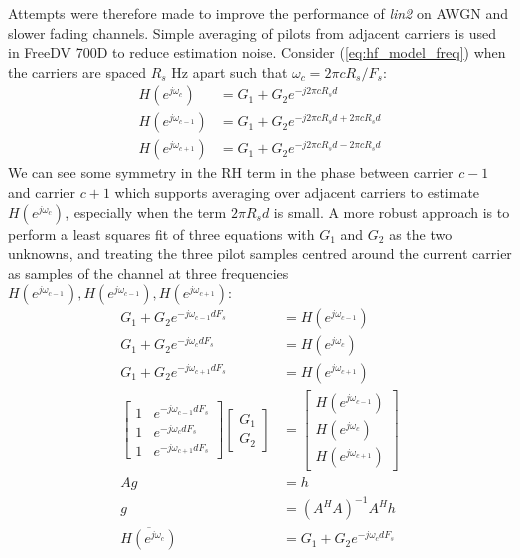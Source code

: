 \documentclass{article}
\begin{document}
Attempts were therefore made to improve the performance of \emph{lin2} on AWGN and slower fading channels.  Simple averaging of pilots from adjacent carriers is used in FreeDV 700D to reduce estimation noise.  Consider (\ref{eq:hf_model_freq}) when the carriers are spaced $R_s$ Hz apart such that $\omega_c = 2 \pi c R_s/F_s$:
\begin{equation}
\begin{split}
H(e^{j \omega_c})      &= G_1 + G_2 e^{-j 2 \pi c R_s d} \\
H(e^{j \omega_{c-1}}) &= G_1 + G_2 e^{-j 2 \pi c R_s d + 2 \pi c R_s d} \\
H(e^{j \omega_{c+1}}) &= G_1 + G_2 e^{-j 2 \pi c R_s d - 2 \pi c R_s d}
\end{split}
\end{equation}
We can see some symmetry in the RH term in the phase between carrier $c-1$ and carrier $c+1$ which supports averaging over adjacent carriers to estimate $H(e^{j \omega_c})$, especially when the term $2 \pi R_s d$ is small.  A more robust approach is to perform a least squares fit \cite{bergada2014digital} of three equations with $G_1$ and $G_2$ as the two unknowns, and treating the three pilot samples centred around the current carrier as samples of the channel at three frequencies $H(e^{j \omega_{c-1}}), H(e^{ j\omega_{c-1}}), H(e^{j\omega_{c+1}})$:
\begin{equation}
\label{eq:combine_freq}
\begin{split}
G_1 + G_2 e^{-j \omega_{c-1} d F_s} &= H(e^{j \omega_{c-1}}) \\
G_1 + G_2 e^{-j \omega_{c}   d F_s} &= H(e^{j \omega_c})      \\
G_1 + G_2 e^{-j \omega_{c+1} d F_s} &= H(e^{j \omega_{c+1}}) \\
\begin{bmatrix}
  1 & e^{-j \omega_{c-1} d F_s} \\
  1 & e^{-j \omega_{c}   d F_s} \\
  1 & e^{-j \omega_{c+1} d F_s}
\end{bmatrix} 
\begin{bmatrix}
  G_1 \\
  G_2
\end{bmatrix} 
&= \begin{bmatrix}
  H(e^{j \omega_{c-1}}) \\
  H(e^{j \omega_c}) \\
  H(e^{j \omega_{c+1}})
\end{bmatrix} \\
Ag &= h \\
 g &= (A^HA)^{-1}A^Hh \\
 \overline{H(e^{j \omega_c})} &= G_1 + G_2e^{-j \omega_{c}   d F_s}
\end{split}
\end{equation} 
\end{document}
